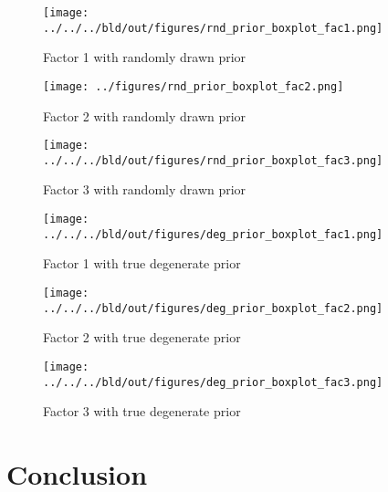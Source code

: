 \documentclass[11pt, a4paper, leqno]{article}
\begin{document}
\begin{figure}
	\centering
 		\caption{Factor 1 with randomly drawn prior}
\texttt{[image: ../../../bld/out/figures/rnd\_prior\_boxplot\_fac1.png]}
 	
\end{figure}

\begin{figure}
	\centering
 		\caption{Factor 2 with randomly drawn prior}
\texttt{[image: ../figures/rnd\_prior\_boxplot\_fac2.png]}
\end{figure}

\begin{figure}
	\centering
 		\caption{Factor 3 with randomly drawn prior}
\texttt{[image: ../../../bld/out/figures/rnd\_prior\_boxplot\_fac3.png]}
\end{figure}
\begin{figure}
	\centering
 		\caption{Factor 1 with true degenerate prior}
\texttt{[image: ../../../bld/out/figures/deg\_prior\_boxplot\_fac1.png]}

\end{figure}

\begin{figure}
	\centering
 		\caption{Factor 2 with true degenerate prior}
\texttt{[image: ../../../bld/out/figures/deg\_prior\_boxplot\_fac2.png]}
\end{figure}
\begin{figure}
	\centering
 		\caption{Factor 3 with true degenerate prior}
\texttt{[image: ../../../bld/out/figures/deg\_prior\_boxplot\_fac3.png]}
 
\end{figure}

\section{Conclusion}

\newpage











\clearpage







\end{document}
